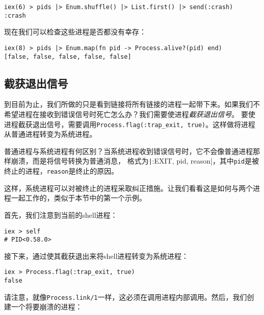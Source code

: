 \begin{code}{}
\begin{verbatim}
iex(6) > pids |> Enum.shuffle() |> List.first() |> send(:crash)
:crash
\end{verbatim}
\end{code}

现在我们可以检查这些进程是否都没有幸存：

\begin{code}{}
\begin{verbatim}
iex(8) > pids |> Enum.map(fn pid -> Process.alive?(pid) end)
[false, false, false, false, false]
\end{verbatim}
\end{code}

\subsection{截获退出信号}

到目前为止，我们所做的只是看到链接将所有链接的进程一起带下来。如果我们不希望进程在接收到错误信号时死亡怎么办？我们需要使进程\emph{截获退出信号}。
要使进程截获退出信号，需要调用\texttt{Process.flag(:trap\_exit, true)}。这样做将进程从普通进程转变为系统进程。

普通进程与系统进程有何区别？当系统进程收到错误信号时，它不会像普通进程那样崩溃，而是将信号转换为普通消息，
格式为\texttt|{:EXIT, pid, reason}|，其中\texttt{pid}是被终止的进程，\texttt{reason}是终止的原因。

这样，系统进程可以对被终止的进程采取纠正措施。让我们看看这是如何与两个进程一起工作的，类似于本节中的第一个示例。

首先，我们注意到当前的shell进程：

\begin{code}{}
\begin{verbatim}
iex > self
# PID<0.58.0>
\end{verbatim}
\end{code}

接下来，通过使其截获退出来将shell进程转变为系统进程：

\begin{code}{}
\begin{verbatim}
iex > Process.flag(:trap_exit, true)
false
\end{verbatim}
\end{code}

请注意，就像\texttt{Process.link/1}一样，这必须在调用进程内部调用。然后，我们创建一个将要崩溃的进程：

